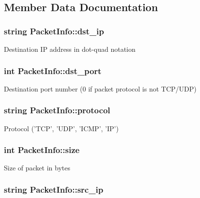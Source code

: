 \subsection{Member Data Documentation}
\hypertarget{structPacketInfo_adbaddfdd6f5b8dba9f800026715af8c4}{
\subsubsection[{dst\-\_\-ip}]{\setlength{\rightskip}{0pt plus 5cm}string Packet\-Info\-::dst\-\_\-ip}}\label{structPacketInfo_adbaddfdd6f5b8dba9f800026715af8c4}
Destination I\-P address in dot-\/quad notation \hypertarget{structPacketInfo_a6c7020347474289fb303f39e516d8fb6}{
\subsubsection[{dst\-\_\-port}]{\setlength{\rightskip}{0pt plus 5cm}int Packet\-Info\-::dst\-\_\-port}}\label{structPacketInfo_a6c7020347474289fb303f39e516d8fb6}
Destination port number (0 if packet protocol is not T\-C\-P/\-U\-D\-P) \hypertarget{structPacketInfo_a3a87fd54a7cc270d6156abcb838b23d2}{
\subsubsection[{protocol}]{\setlength{\rightskip}{0pt plus 5cm}string Packet\-Info\-::protocol}}\label{structPacketInfo_a3a87fd54a7cc270d6156abcb838b23d2}
Protocol ('T\-C\-P', 'U\-D\-P', 'I\-C\-M\-P', 'I\-P') \hypertarget{structPacketInfo_ac4fa3140b956f92ee7e76d325702327a}{
\subsubsection[{size}]{\setlength{\rightskip}{0pt plus 5cm}int Packet\-Info\-::size}}\label{structPacketInfo_ac4fa3140b956f92ee7e76d325702327a}
Size of packet in bytes \hypertarget{structPacketInfo_a020c9727f4f766c3927a49af904a1879}{
\subsubsection[{src\-\_\-ip}]{\setlength{\rightskip}{0pt plus 5cm}string Packet\-Info\-::src\-\_\-ip}}\label{structPacketInfo_a020c9727f4f766c3927a49af904a1879}
